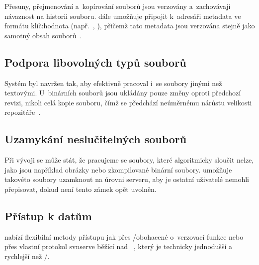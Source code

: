 Přesuny, přejmenování a~kopírování souborů jsou verzovány a~zachovávají návaznost na historii souboru. \SVN dále umožňuje připojit k~adresáři metadata ve formátu klíč:hodnota (např.\ , ), přičemž tato metadata jsou verzována stejně jako samotný obsah souborů~\cite{svnbook17}.


\subsection*{Podpora libovolných typů souborů}
\label{sec:svn_binary}
Systém byl navržen tak, aby efektivně pracoval i~se soubory jinými než textovými. U~binárních souborů jsou ukládány pouze změny oproti předchozí revizi, nikoli celá kopie souboru, čímž se předchází neúměrnému nárůstu velikosti repozitáře~\cite{svnbook17}.


\subsection*{Uzamykání neslučitelných souborů}
\label{sec:svn_locking}
Při vývoji se může stát, že pracujeme se soubory, které algoritmicky sloučit nelze, jako jsou například obrázky nebo zkompilované binární soubory. \SVN umožňuje takovéto soubory uzamknout na úrovni serveru, aby je ostatní uživatelé nemohli přepisovat, dokud není tento zámek opět uvolněn.


\subsection*{Přístup k datům}
\label{sec:svn_access}
\SVN nabízí flexibilní metody přístupu jak přes \HTTP/\HTTPS obohacené o~verzovací funkce nebo přes vlastní protokol svnserve běžící nad \TCPIP~\cite{svnbook17}, který je technicky jednodušší a rychlejší než \HTTP/\HTTPS.



\endinput